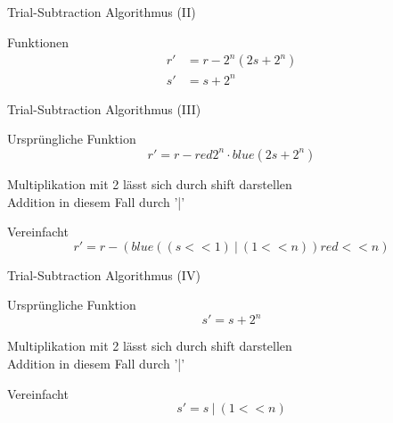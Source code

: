   \begin{frame} {Trial-Subtraction Algorithmus (II)}
    \begin{block} {Funktionen}
      \begin{align*}
        r' &= r - 2^n (2s + 2^n) \\
        s' &= s + 2^n
      \end{align*}
    \end{block}
  \end{frame}

  \begin{frame} {Trial-Subtraction Algorithmus (III)}
    \begin{block} {Ursprüngliche Funktion}
      \begin{equation*}
        r' = r - \boxed{red}{2^n\cdot}\boxed{blue}{(2s + 2^n)}
      \end{equation*}
    \end{block}

    \begin{exampleblock} {}
      Multiplikation mit 2 lässt sich durch shift darstellen \\
      Addition in diesem Fall durch '|'
    \end{exampleblock}
    \begin{block} {Vereinfacht}
      \begin{equation*}
        r' = r - (\boxed{blue}{((s << 1)~|~(1 << n))} \boxed{red}{<< n})
      \end{equation*}
    \end{block}
  \end{frame}

  \begin{frame} {Trial-Subtraction Algorithmus (IV)}
    \begin{block} {Ursprüngliche Funktion}
      \begin{equation*}
        s' = s + 2^n
      \end{equation*}
    \end{block}
    \begin{exampleblock} {}
      Multiplikation mit 2 lässt sich durch shift darstellen \\
      Addition in diesem Fall durch '|'
    \end{exampleblock}
    \begin{block} {Vereinfacht}
      \begin{equation*}
        s' = s~|~(1 << n)
      \end{equation*}
    \end{block}
  \end{frame}

